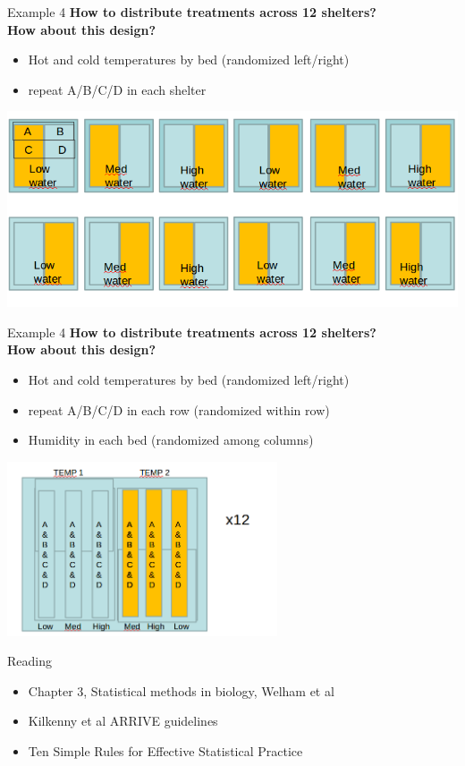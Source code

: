\documentclass[10pt]{beamer}
\begin{document}
\begin{frame}{Example 4}
\textbf{How to distribute treatments across 12 shelters?\\ How about this design?}
\begin{itemize}
 \item Hot and cold temperatures by bed (randomized left/right)
 \item repeat A/B/C/D in each shelter
\end{itemize}
  \centering
  \includegraphics[width=\textwidth]{Figures/shelters4}
\end{frame}

\begin{frame}{Example 4}
\textbf{How to distribute treatments across 12 shelters?\\ How about this design?}
\begin{itemize}
 \item Hot and cold temperatures by bed (randomized left/right)
 \item repeat A/B/C/D in each row (randomized within row)
 \item Humidity in each bed (randomized among columns)
\end{itemize}
  \centering
  \includegraphics[width=0.6\textwidth]{Figures/shelters5}
\end{frame}


\begin{frame}{Reading}

 \begin{itemize}
  \item Chapter 3, Statistical methods in biology, Welham et al
  \item Kilkenny et al ARRIVE guidelines
  \item Ten Simple Rules for Effective Statistical Practice
 \end{itemize}

\end{frame}
\end{document}
